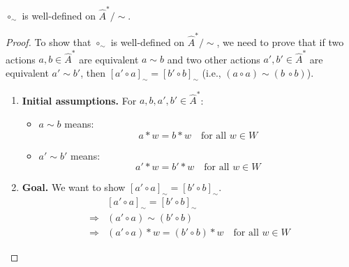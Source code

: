 \begin{proposition}\label{prp:circ_sim_well_defined}
	$\circ_{\sim}$ is well-defined on $\hat{A}^{\ast}/\sim$.
\end{proposition}
\begin{proof}
	To show that $\circ_{\sim}$ is well-defined on $\hat{A}^{\ast}/\sim$, we need to prove that if two actions $a,b \in \hat{A}^{\ast}$ are equivalent $a \sim b$ and two other actions $a', b' \in \hat{A}^{\ast}$ are equivalent $a' \sim b'$, then $[a' \circ a]_{\sim} = [b' \circ b]_{\sim}$ (i.e., $(a \circ a) \sim (b\ \circ b)$).

	\begin{enumerate}[(1)]
		\item \textbf{Initial assumptions.}
		      For $a, b, a', b' \in \hat{A}^{\ast}$:
		      \begin{itemize}
			      \item $a \sim b$ means:
			            \begin{equation}
				            a \ast w = b \ast w \quad \text{for all } w\in W
			            \end{equation}
			      \item $a' \sim b'$ means:
			            \begin{equation}
				            a' \ast w = b' \ast w \quad \text{for all } w\in W
			            \end{equation}
		      \end{itemize}

		\item \textbf{Goal.}
		      We want to show $[a' \circ a]_{\sim} = [b' \circ b]_{\sim}$.
		      \begin{align}
			                    & [a' \circ a]_{\sim} = [b' \circ b]_{\sim}                               \\
			      \Rightarrow{} & (a' \circ a) \sim (b' \circ b)                                          \\
			      \Rightarrow{} & (a' \circ a) \ast w = (b' \circ b) \ast w \quad \text{for all } w \in W
		      \end{align}


\end{enumerate}
\end{proof}
